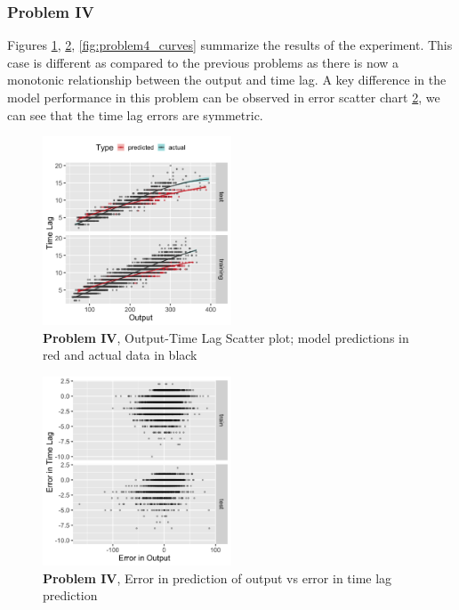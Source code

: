 \documentclass[envcountsect,runningheads]{llncs}
\theoremstyle{etoile}
\begin{document}
\subsubsection{Problem IV}

Figures \ref{fig:problem4_scatter}, \ref{fig:problem4_error}, \ref{fig:problem4_curves} summarize 
the results of the experiment. This case is different as compared to the previous problems as there 
is now a monotonic relationship between the output and time lag. A key difference in the model 
performance in this problem can be observed in error scatter chart \ref{fig:problem4_error}, 
we can see that the time lag errors are symmetric.


\begin{figure}[h]
\vspace{.3in}
\centerline{\includegraphics[width=0.5\textwidth]{figures/exp4_scatter_v_tl.png}}
\vspace{.3in}
\caption{\textbf{Problem IV}, Output-Time Lag Scatter plot; model predictions in red and actual data in black}
\label{fig:problem4_scatter}
\end{figure}

\begin{figure}[h]
\vspace{.3in}
\centerline{\includegraphics[width=0.5\textwidth]{figures/exp4_scatter_errors.png}}
\vspace{.3in}
\caption{\textbf{Problem IV}, Error in prediction of output vs error in time lag prediction}
\label{fig:problem4_error}
\end{figure}
\end{document}
